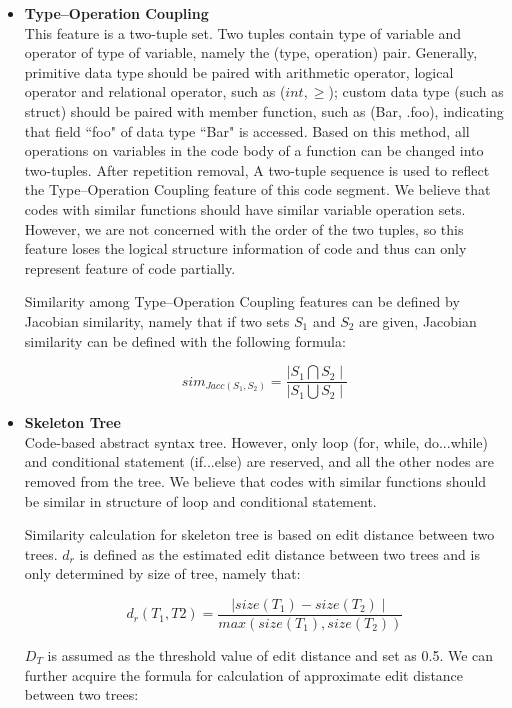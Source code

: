 \begin{itemize}
	\item \textbf{Type–Operation Coupling} \\
	This feature is a two-tuple set. Two tuples contain type of variable and operator of type of variable, namely the (type, operation) pair. Generally, primitive data type should be paired with arithmetic operator, logical operator and relational operator, such as ($int, \geq$); custom data type (such as struct) should be paired with member function, such as (Bar, .foo), indicating that field ``foo" of data type ``Bar" is accessed. Based on this method, all operations on variables in the code body of a function can be changed into two-tuples. After repetition removal, A two-tuple sequence is used to reflect the Type–Operation Coupling feature of this code segment. We believe that codes with similar functions should have similar variable operation sets. However, we are not concerned with the order of the two tuples, so this feature loses the logical structure information of code and thus can only represent feature of code partially.

	Similarity among Type–Operation Coupling features can be defined by Jacobian similarity, namely that if two sets $S_1$ and $S_2$ are given, Jacobian similarity can be defined with the following formula:

	\begin{equation}
	sim_{Jacc(S_{1}, S_{2})}=\frac{\mid S_{1}\bigcap S_{2}\mid}{\mid S_{1}\bigcup S_{2}\mid}
	\end{equation}

	\item \textbf{Skeleton Tree} \\
	Code-based abstract syntax tree. However, only loop (for, while, do...while) and conditional statement (if...else) are reserved, and all the other nodes are removed from the tree. We believe that codes with similar functions should be similar in structure of loop and conditional statement.

	Similarity calculation for skeleton tree is based on edit distance between two trees. $d_{r}$ is defined as the estimated edit distance between two trees and is only determined by size of tree, namely that:

	\begin{equation}
	d_{r}(T_{1}, T{2})=\frac{\mid size(T_{1})-size(T_{2})\mid}{max(size(T_{1}), size(T_{2}))}
	\end{equation}

	$D_T$ is assumed as the threshold value of edit distance and set as 0.5. We can further acquire the formula for calculation of approximate edit distance between two trees:


\end{itemize}
